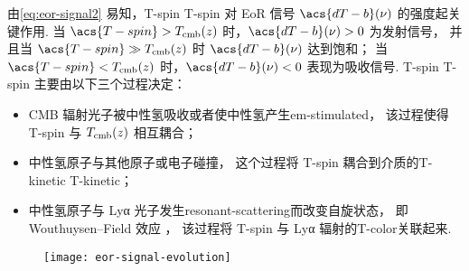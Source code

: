 由\autoref{eq:eor-signal2} 易知，\acl{T-spin} \acs{T-spin}
对 EoR 信号 $\acs{dT-b}(\nu)$ 的强度起关键作用.
当 $\acs{T-spin} > T_{\R{cmb}}(z)$ 时，$\acs{dT-b}(\nu) > 0$ 为发射信号，
并且当 $\acs{T-spin} \gg T_{\R{cmb}}(z)$ 时 $\acs{dT-b}(\nu)$ 达到饱和；
当 $\acs{T-spin} < T_{\R{cmb}}(z)$ 时，$\acs{dT-b}(\nu) < 0$ 表现为吸收信号.
\acl{T-spin} \acs{T-spin} 主要由以下三个过程决定：
\begin{itemize}
  \item CMB 辐射光子被中性氢吸收或者使中性氢产生\ac{em-stimulated}，
    该过程使得 \acs{T-spin} 与 $T_{\mathrm{cmb}}(z)$ 相互耦合；
  \item 中性氢原子与其他原子或电子碰撞，
    这个过程将 \acs{T-spin} 耦合到介质的\acl{T-kinetic} \acs{T-kinetic}；
  \item 中性氢原子与 Lyα 光子发生\ac{resonant-scattering}而改变自旋状态，
    即 Wouthuysen--Field 效应 \cite{wouthuysen1952,field1958}，
    该过程将 \acs{T-spin} 与 Lyα 辐射的\ac{T-color}关联起来.
\end{itemize}

\begin{figure}[htp]
  \centering
  \texttt{[image: eor-signal-evolution]}
  \label{fig:eor-signal-evo}
\end{figure}


